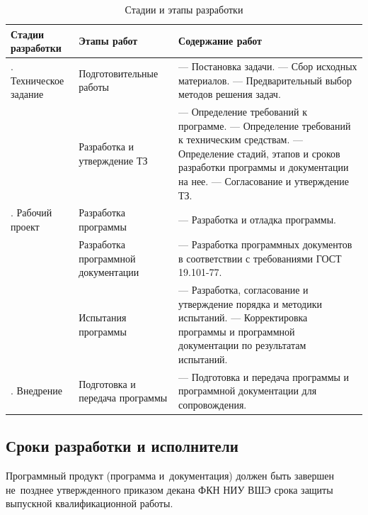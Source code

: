 \documentclass[12pt,a4paper]{extarticle}
\begin{document}
\begin{table}[H]
\caption{Стадии и этапы разработки}
\label{tab:stages}
\small
\begin{tabularx}{\textwidth}{|>{\raggedright\arraybackslash}p{3.5cm}|>{\raggedright\arraybackslash}p{3.5cm}|>{\raggedright\arraybackslash}X|}
\hline
\textbf{Стадии разработки} & \textbf{Этапы работ} & \textbf{Содержание работ} \\
\hline
1. Техническое задание & Подготовительные работы & --- Постановка задачи.\newline
--- Сбор исходных материалов.\newline
--- Предварительный выбор методов решения задач. \\
\hline
& Разработка и утверждение ТЗ & --- Определение требований к программе.\newline
--- Определение требований к техническим средствам.\newline
--- Определение стадий, этапов и сроков разработки программы и документации на нее.\newline
--- Согласование и утверждение ТЗ. \\
\hline
2. Рабочий проект & Разработка программы & --- Разработка и отладка программы. \\
\hline
& Разработка программной документации & --- Разработка программных документов в соответствии с требованиями ГОСТ 19.101-77\cite{gost19101}. \\
\hline
& Испытания программы & --- Разработка, согласование и утверждение порядка и методики испытаний.\newline
--- Корректировка программы и программной документации по результатам испытаний. \\
\hline
3. Внедрение & Подготовка и передача программы & --- Подготовка и передача программы и программной документации для сопровождения. \\
\hline
\end{tabularx}
\end{table}

\subsection{Сроки разработки и исполнители}

Программный продукт (программа и~документация) должен быть завершен не~позднее утвержденного приказом декана ФКН НИУ ВШЭ срока защиты выпускной квалификационной работы.
\end{document}
